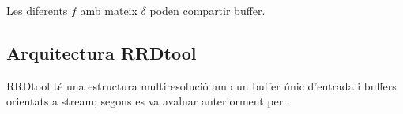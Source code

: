 Les diferents $f$ amb mateix $\delta$ poden compartir buffer.





\subsection{Arquitectura RRDtool}


RRDtool té una estructura multiresolució amb un buffer únic d'entrada
i buffers orientats a stream; segons es va avaluar anteriorment per
\textcite{llusa11:tfm}.





